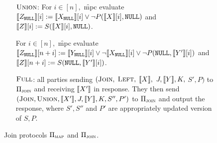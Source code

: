 \begin{figure}
{\begin{minipage}{0.95\linewidth}
\begin{enumerate}[leftmargin=.5cm]
\begin{enumerate}[leftmargin=0.6cm]
					
					\item[$\textsc{Union}$:] 
					For $i\in [n],$ \f{mpc} evaluate $\llbracket Z_\texttt{NULL}\rrbracket[i]:= \llbracket X_\texttt{NULL}\rrbracket[i] \vee \neg P(\llbracket X\rrbracket[i], \texttt{NULL})$ and $\llbracket Z\rrbracket[i]:=S(\llbracket X\rrbracket[i], \texttt{NULL})$. 
					
					For $i\in [n],$ \f{mpc} evaluate $\llbracket Z_\texttt{NULL}\rrbracket[n+i]:= \llbracket Y_\texttt{NULL}\rrbracket[i] \vee \neg \llbracket X_\texttt{NULL}\rrbracket[i] \vee \neg P(\texttt{NULL}, \llbracket Y'\rrbracket[i])$ and $\llbracket Z\rrbracket[n+i]:=S(\texttt{NULL}, \llbracket Y'\rrbracket[i])$.
					
					\item[$\textsc{Full}$:] all parties sending $(\textsc{Join},$ $\textsc{Left},$ $\llbracket X\rrbracket,$ $J, \llbracket Y\rrbracket, K,$ $S', P)$ to $\Pi_{\textsc{join}}$ and receiving $\llbracket X'\rrbracket$ in response. They then send $(\textsc{Join}, \textsc{Union}, \llbracket X'\rrbracket, J, \llbracket Y\rrbracket, K, S'', P')$  to $\Pi_{\textsc{join}}$ and output the response, where $S',S''$ and $P'$ are appropriately updated version of $S,P$.
				\end{enumerate}
				 

			\end{enumerate}
	\end{minipage}}
\vspace{-0.3cm}
	\caption{Join protocols $\Pi_{\textsc{map}}$ and $\Pi_{\textsc{join}}$.}
	\label{fig:full_proto}	
	\vspace{-0.3cm}
\end{figure}



